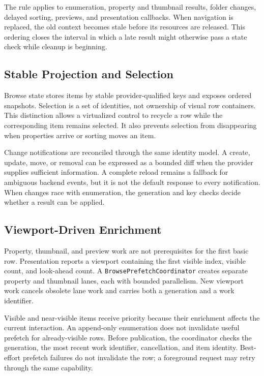 \documentclass[10pt,a4paper,twoside]{article}
\begin{document}
The rule applies to enumeration, property and thumbnail results, folder changes, delayed sorting, previews, and
presentation callbacks. When navigation is replaced, the old context becomes stale before its resources are
released. This ordering closes the interval in which a late result might otherwise pass a state check while
cleanup is beginning.

\subsection{Stable Projection and Selection}

Browse state stores items by stable provider-qualified keys and exposes ordered snapshots. Selection is a set of
identities, not ownership of visual row containers. This distinction allows a virtualized control to recycle a
row while the corresponding item remains selected. It also prevents selection from disappearing when properties
arrive or sorting moves an item.

Change notifications are reconciled through the same identity model. A create, update, move, or removal can be
expressed as a bounded diff when the provider supplies sufficient information. A complete reload remains a
fallback for ambiguous backend events, but it is not the default response to every notification. When changes
race with enumeration, the generation and key checks decide whether a result can be applied.

\subsection{Viewport-Driven Enrichment}

Property, thumbnail, and preview work are not prerequisites for the first basic row. Presentation reports a
viewport containing the first visible index, visible count, and look-ahead count. A
\texttt{BrowsePrefetchCoordinator} creates separate property and thumbnail lanes, each with bounded parallelism.
New viewport work cancels obsolete lane work and carries both a generation and a work identifier.

Visible and near-visible items receive priority because their enrichment affects the current interaction. An
append-only enumeration does not invalidate useful prefetch for already-visible rows. Before publication, the
coordinator checks the generation, the most recent work identifier, cancellation, and item identity. Best-effort
prefetch failures do not invalidate the row; a foreground request may retry through the same capability.
\end{document}

